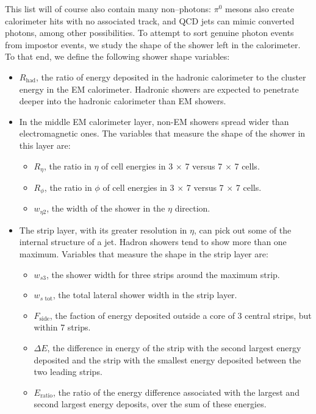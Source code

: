 This list will of course also contain many non--photons: $\pi^0$ mesons also create calorimeter hits with no associated track, and QCD jets can mimic converted photons, among other possibilities. To attempt to sort genuine photon events from impostor events, we study the shape of the shower left in the calorimeter. To that end, we define the following shower shape variables:

\begin{itemize}
\item $R_\text{had}$, the ratio of energy deposited in the hadronic calorimeter to the cluster energy in the EM calorimeter. Hadronic showers are expected to penetrate deeper into the hadronic calorimeter than EM showers.
\item In the middle EM calorimeter layer, non-EM showers spread wider than electromagnetic ones. The variables that measure the shape of the shower in this layer are:
\begin{itemize}
\item $R_\eta$, the ratio in $\eta$ of cell energies in 3 $\times$ 7 versus 7 $\times$ 7 cells.
\item $R_\phi$, the ratio in $\phi$ of cell energies in 3 $\times$ 7 versus 7 $\times$ 7 cells.
\item $w_{\eta 2}$, the width of the shower in the $\eta$ direction.
\end{itemize}
\item The strip layer, with its greater resolution in $\eta$, can pick out some of the internal structure of a jet. Hadron showers tend to show more than one maximum. Variables that measure the shape in the strip layer are:
\begin{itemize}
\item $w_{s3}$, the shower width for three strips around the maximum strip.
\item $w_{s\text{ tot}}$, the total lateral shower width in the strip layer.
\item $F_\text{side}$, the faction of energy deposited outside a core of 3 central strips, but within 7 strips.
\item $\Delta E$, the difference in energy of the strip with the second largest energy deposited and the strip with the smallest energy deposited between the two leading strips.
\item $E_\text{ratio}$, the ratio of the energy difference associated with the
largest and second largest energy deposits, over the sum of these energies.
\end{itemize}
\end{itemize}

